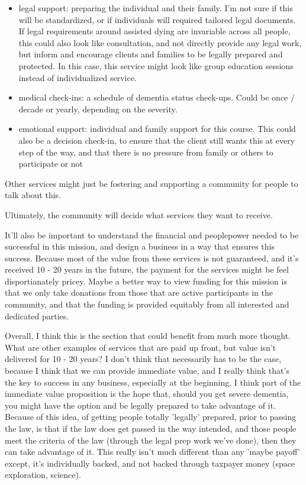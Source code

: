 \documentclass{proposalnsf}
\begin{document}
      \begin{itemize}
          \item{legal support: preparing the individual and their family. I'm not sure if this will be standardized, or if individuals will required tailored legal documents. If legal requirements around assisted dying are invariable across all people, this could also look like consultation, and not directly provide any legal work, but inform and encourage clients and families to be legally prepared and protected. In this case, this service might look like group education sessions instead of individualized service.}
          \item{medical check-ins: a schedule of dementia status check-ups. Could be once / decade or yearly, depending on the severity.}
          \item{emotional support: individual and family support for this course. This could also be a decision check-in, to ensure that the client still wants this at every step of the way, and that there is no pressure from family or others to participate or not}
      \end{itemize}

Other services might just be fostering and supporting a community for people to talk about this.

\bigskip

Ultimately, the community will decide what services they want to receive.

\bigskip

It'll also be important to understand the financial and peoplepower needed to be successful in this mission, and design a business in a way that ensures this success. Because most of the value from these services is not guaranteed, and it's received 10 - 20 years in the future, the payment for the services might be feel disportianately pricey. Maybe a better way to view funding for this mission is that we only take donations from those that are active participants in the community, and that the funding is provided equitably from all interested and dedicated parties.

Overall, I think this is the section that could benefit from much more thought. What are other examples of services that are paid up front, but value isn't delivered for 10 - 20 years? I don't think that necessarily has to be the case, because I think that we can provide immediate value, and I really think that's the key to success in any business, especially at the beginning. I think part of the immediate value proposition is the hope that, should you get severe dementia, you might have the option and be legally prepared to take advantage of it. Because of this idea, of getting people totally 'legally' prepared, prior to passing the law, is that if the law does get passed in the way intended, and those people meet the criteria of the law (through the legal prep work we've done), then they can take advantage of it. This really isn't much different than any 'maybe payoff' except, it's individually backed, and not backed through taxpayer money (space exploration, science).
\end{document}
